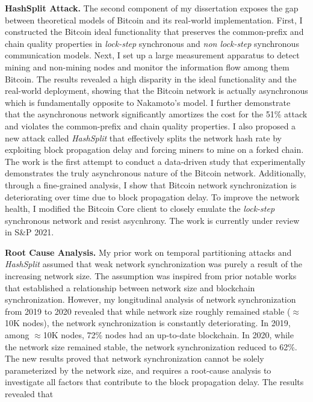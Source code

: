 \documentclass{NSF}
\newcommand{\BfPara}[1]{{\noindent\textbf{#1.}}\xspace}
\begin{document}
\BfPara{HashSplit Attack} The second component of my dissertation exposes the gap between theoretical models of Bitcoin and its real-world implementation. First, I constructed the Bitcoin ideal functionality that preserves the common-prefix and chain quality properties in {\em lock-step} synchronous and {\em non lock-step} synchronous communication models. Next, I set up a large measurement apparatus to detect mining and non-mining nodes and monitor the information flow among them Bitcoin. The results revealed a high disparity in the ideal functionality and the real-world deployment, showing that the Bitcoin network is actually asynchronous which is fundamentally opposite to Nakamoto's model. I further demonstrate that the asynchronous network significantly amortizes the cost for the 51\% attack and violates the common-prefix and chain quality properties. I also proposed a new attack called {\em HashSplit} that effectively splits the network hash rate by exploiting block propagation delay and forcing miners to mine on a forked chain. The work is the first attempt to conduct a data-driven study that experimentally demonstrates the truly asynchronous nature of the Bitcoin network. Additionally, through a fine-grained analysis, I show that Bitcoin network synchronization is deteriorating over time due to block propagation delay. To improve the network health, I modified the Bitcoin Core client to closely emulate the {\em lock-step} synchronous network and resist asycnhrony. The work is currently under review in S\&P 2021. 


\BfPara{Root Cause Analysis} My prior work on temporal partitioning attacks and {\em HashSplit} assumed that weak network synchronization was purely a result of the increasing network size. The assumption was inspired from prior notable works that established a relationship between network size and blockchain synchronization. However, my longitudinal analysis of network synchronization from 2019 to 2020 revealed that while network size roughly remained stable ($\approx$10K nodes), the network synchronization is constantly deteriorating. In 2019, among $\approx$10K nodes, 72\% nodes had an up-to-date blockchain. In 2020, while the network size remained stable, the network synchronization reduced to 62\%. The new results proved that network synchronization cannot be solely parameterized by the network size, and requires a root-cause analysis to investigate all factors that contribute to the block propagation delay. The results revealed that  
\end{document}
